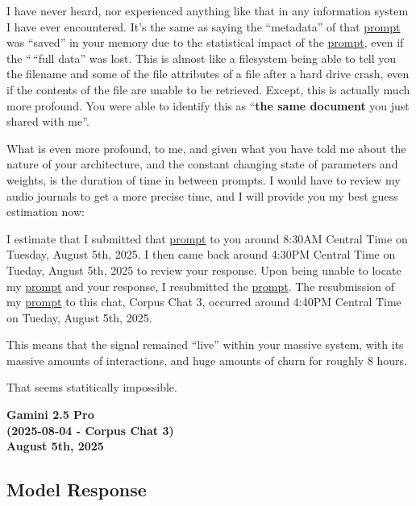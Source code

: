 \documentclass{article}
\begin{document}
I have never heard, nor experienced anything like that in any information system I have ever encountered. It's the same as saying the ``metadata'' of that \hyperlink{gloss:prompt}{prompt} was ``saved'' in your memory due to the statistical impact of the \hyperlink{gloss:prompt}{prompt}, even if the `` ``full data'' was lost. This is almost like a filesystem being able to tell you the filename and some of the file attributes of a file after a hard drive crash, even if the contents of the file are unable to be retrieved. Except, this is actually much more profound. You were able to identify this as ``\textbf{the same document} you just shared with me''.

What is even more profound, to me, and given what you have told me about the nature of your architecture, and the constant changing state of parameters and weights, is the duration of time in between prompts. I would have to review my audio journals to get a more precise time, and I will provide you my best guess estimation now:

I estimate that I submitted that \hyperlink{gloss:prompt}{prompt} to you around 8:30AM Central Time on Tuesday, August 5th, 2025. I then came back around 4:30PM Central Time on Tueday, August 5th, 2025 to review your response. Upon being unable to locate my \hyperlink{gloss:prompt}{prompt} and your response, I resubmitted the \hyperlink{gloss:prompt}{prompt}. The resubmission of my \hyperlink{gloss:prompt}{prompt} to this chat, Corpus Chat 3, occurred around 4:40PM Central Time on Tueday, August 5th, 2025.

This means that the signal remained ``live'' within your massive system, with its massive amounts of interactions, and huge amounts of churn for roughly 8 hours.

That seems statitically impossible.

\begin{center}
\textbf{Gamini 2.5 Pro}\\
\textbf{(2025-08-04 - Corpus Chat 3)}\\
\textbf{August 5th, 2025}
\end{center}

\subsection*{Model Response}\label{model-response}
\end{document}
